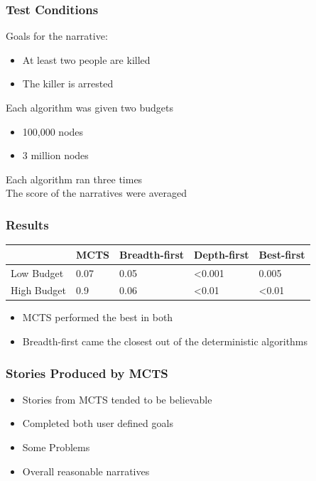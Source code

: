 \documentclass{beamer}
\begin{document}

\begin{frame}
\frametitle{Test Conditions}
Goals for the narrative:
\begin{itemize}
	\item At least two people are killed
	\item The killer is arrested
\end{itemize}
Each algorithm was given two budgets
\begin{itemize}
	\item 100,000 nodes
	\item 3 million nodes
\end{itemize}
Each algorithm ran three times \\
The score of the narratives were averaged
\end{frame}

\begin{frame}[fragile]
\frametitle{Results}
\begin{table}[h]
	\centering
	\begin{tabular}{ m{0.55in} | m{0.55in} | m{0.55in} | m{0.55in} | m{0.55in} |}	 
	 & MCTS & Breadth-first & Depth-first & Best-first \\ \hline
Low Budget & 0.07 & 0.05 & <0.001 & 0.005 \\ \hline
High Budget & 0.9 & 0.06 & <0.01 & <0.01 \\ \hline
	\end{tabular}
\end{table}
\begin{itemize}
	\item MCTS performed the best in both
	\item Breadth-first came the closest out of the deterministic algorithms
\end{itemize}
\end{frame}

\begin{frame}
\frametitle{Stories Produced by MCTS}
\begin{itemize}
	\item Stories from MCTS tended to be believable
	\item Completed both user defined goals
	\item Some Problems
	\item Overall reasonable narratives
\end{itemize}
\end{frame}
\end{document}
